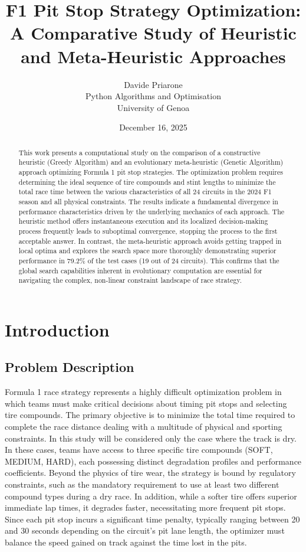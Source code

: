 \documentclass[10pt]{article}
\title{\textbf{F1 Pit Stop Strategy Optimization:\\A Comparative Study of Heuristic and Meta-Heuristic Approaches}}
\author{Davide Priarone\\Python Algorithms and Optimisation\\University of Genoa}
\date{December 16, 2025}
\begin{document}
\maketitle

\begin{abstract}
This work presents a computational study on the comparison of a constructive heuristic (Greedy Algorithm) and an evolutionary meta-heuristic (Genetic Algorithm) approach optimizing Formula 1 pit stop strategies.
The optimization problem requires determining the ideal sequence of tire compounds and stint lengths to minimize the total race time between the various characteristics of all 24 circuits in the 2024 F1 season and all physical constraints.
The results indicate a fundamental divergence in performance characteristics driven by the underlying mechanics of each approach. The heuristic method offers instantaneous execution and its localized decision-making process frequently leads to suboptimal convergence, stopping the process to the first acceptable answer. 
In contrast, the meta-heuristic approach avoids getting trapped in local optima and explores the search space more thoroughly demonstrating superior performance in 79.2\% of the test cases (19 out of 24 circuits). This confirms that the global search capabilities inherent in evolutionary computation are essential for navigating the complex, non-linear constraint landscape of race strategy.
\end{abstract}

\section{Introduction}

\subsection{Problem Description}

Formula 1 race strategy represents a highly difficult optimization problem in which teams must make critical decisions about timing pit stops and selecting tire compounds.
The primary objective is to minimize the total time required to complete the race distance dealing with a multitude of physical and sporting constraints.
In this study will be considered only the case where the track is dry. In these cases, teams have access to three specific tire compounds (SOFT, MEDIUM, HARD), each possessing distinct degradation profiles and performance coefficients.
Beyond the physics of tire wear, the strategy is bound by regulatory constraints, such as the mandatory requirement to use at least two different compound types during a dry race.
In addition, while a softer tire offers superior immediate lap times, it degrades faster, necessitating more frequent pit stops. 
Since each pit stop incurs a significant time penalty, typically ranging between 20 and 30 seconds depending on the circuit's pit lane length, the optimizer must balance the speed gained on track against the time lost in the pits.
\end{document}

